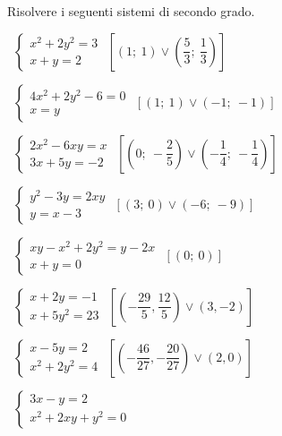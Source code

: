 
\begin{esercizio}[\Ast]
 \label{ese:6.1}
Risolvere i seguenti sistemi di secondo grado.
\begin{multicols}{2}
 \begin{enumeratea}
 \item~\(\left\{\begin{array}{l}x^2+2y^2=3\\x+y=2\end{array}\right.\)
\hfill\(\left[\left(1;~1\right) \vee \left(\dfrac 5 3;~\dfrac 1 
3\right)\right]\)
 \item~\(\left\{\begin{array}{l}4x^2+2y^2-6=0\\x=y\end{array}\right.\)
\hfill\(\left[\left(1;~1\right)\vee \left(-1;~-1\right)\right]\)
 \item~\(\left\{\begin{array}{l}2x^2-6xy=x\\3x+5y=-2\end{array}\right.\)
\hfill\(\left[\left(0;~-\dfrac 2 5\right)\vee 
       \left(-\dfrac 1 4;~-\dfrac 1 4\right)\right]\)
 \item~\(\left\{\begin{array}{l}y^2-3y=2xy\\y=x-3\end{array}\right.\)
\hfill\(\left[\left(3;~0\right)\vee \left(-6;~-9\right)\right]\)
 \item~\(\left\{\begin{array}{l}xy-x^2+2y^2=y-2x\\x+y=0\end{array}\right.\)
\hfill\(\left[\left(0;~0\right)\right]\)
 \item~\(\left\{\begin{array}{l}{x+2y=-1}\\{x+5y^2=23}\end{array}\right.\)
\hfill\(\left[\left(-\dfrac{29} 5,\dfrac{12} 5\right) \vee 
       (3,-2)\right]\)
 \item~\(\left\{\begin{array}{l}{x-5y=2}\\{x^2+2y^2=4}\end{array}\right.\)
\hfill\(\left[\left(-\dfrac{46}{27},-\dfrac{20}{27}\right)\vee 
(2,0)\right]\)
 \item~\(\left\{\begin{array}{l}3x-y=2\\x^2+2xy+y^2=0\end{array}\right.\)

\end{enumeratea}
\end{multicols}
\end{esercizio}
